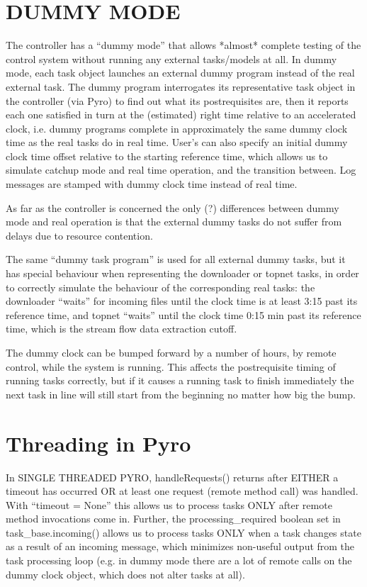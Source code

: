 \documentclass[12pt]{article}
\begin{document}
\section{DUMMY MODE}

The controller has a ``dummy mode'' that allows *almost* complete
testing of the control system without running any external tasks/models
at all. In dummy mode, each task object launches an external dummy
program instead of the real external task. The dummy program
interrogates its representative task object in the controller (via Pyro)
to find out what its postrequisites are, then it reports each one
satisfied in turn at the (estimated) right time relative to an
accelerated clock, i.e. dummy programs complete in approximately the
same dummy clock time as the real tasks do in real time. User's can also
specify an initial dummy clock time offset relative to the starting
reference time, which allows us to simulate catchup mode and real time
operation, and the transition between. Log messages are stamped with
dummy clock time instead of real time.

As far as the controller is concerned the only (?) differences between dummy
mode and real operation is that the external dummy tasks do not suffer from
delays due to resource contention. 

The same ``dummy task program'' is used for all external dummy tasks, but it has
special behaviour when representing the downloader or topnet tasks, in order
to correctly simulate the behaviour of the corresponding real tasks: the
downloader ``waits'' for incoming files until the clock time is at least 3:15
past its reference time, and topnet ``waits'' until the clock time 0:15 min past
its reference time, which is the stream flow data extraction cutoff.

The dummy clock can be bumped forward by a number of hours, by remote control,
while the system is running. This affects the postrequisite timing of running
tasks correctly, but if it causes a running task to finish immediately the
next task in line will still start from the beginning no matter how big the
bump.


\section{Threading in Pyro}

In SINGLE THREADED PYRO, handleRequests() returns after EITHER a timeout has
occurred OR at least one request (remote method call) was handled.  With
``timeout = None'' this allows us to process tasks ONLY after remote method
invocations come in. Further, the processing\_required boolean set in
task\_base.incoming() allows us to process tasks ONLY when a task changes state
as a result of an incoming message, which minimizes non-useful output from the
task processing loop (e.g. in dummy mode there are a lot of remote calls on
the dummy clock object, which does not alter tasks at all). 
\end{document}
